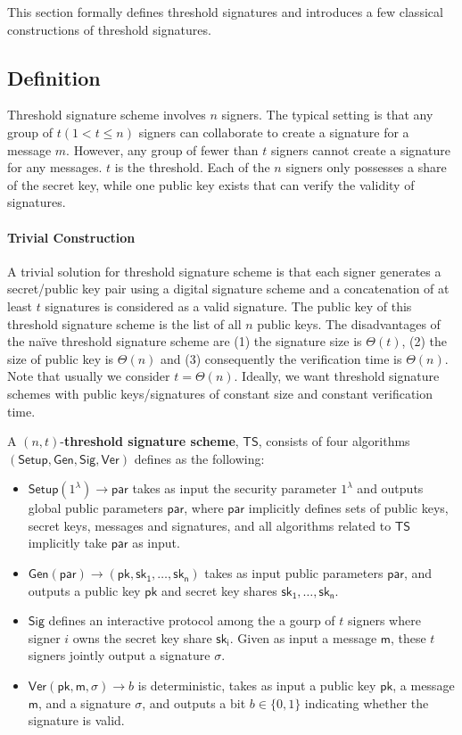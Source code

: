 This section formally defines threshold signatures and introduces a few classical constructions of threshold signatures. 
\subsection{Definition}
Threshold signature scheme involves $n$ signers. The typical setting is that any group of $t (1<t\le n)$ signers can collaborate to create a signature for a message $m$. However, any group of fewer than $t$ signers cannot create a signature for any messages. $t$ is the threshold. Each of the $n$ signers only possesses a share of the secret key, while one public key exists that can verify the validity of signatures. 

\paragraph{Trivial Construction} A trivial solution for threshold signature scheme is that each signer generates a secret/public key pair using a digital signature scheme and a concatenation of at least $t$ signatures is considered as a valid signature. The public key of this threshold signature scheme is the list of all $n$ public keys. The disadvantages of the na\"ive threshold signature scheme are (1) the signature size is $\Theta(t)$, (2) the size of public key is $\Theta(n)$ and (3) consequently the verification time is $\Theta(n)$. Note that usually we consider $t = \Theta(n)$. Ideally, we want threshold signature schemes with public keys/signatures of constant size and constant verification time. 

\begin{definition}
    A $(n, t)$-\textbf{threshold signature scheme}, $\mathsf{TS}$, consists of four algorithms $(\mathsf{Setup, Gen, Sig, Ver})$ defines as the following:
    \begin{itemize}
        \item $\mathsf{Setup}(1^\lambda)\to \mathsf{par}$ takes as input the security parameter $1^\lambda$ and outputs global public parameters $\mathsf{par}$, where $\mathsf{par}$ implicitly defines sets of public keys, secret keys, messages and signatures, and all algorithms related to $\mathsf{TS}$ implicitly take $\mathsf{par}$ as input. 
        \item $\mathsf{Gen(par)}\to (\mathsf{pk, sk_1,\dots, sk_n})$ takes as input public parameters $\mathsf{par}$, and outputs a public key $\mathsf{pk}$ and secret key shares $\mathsf{sk_1, \dots, sk_n}$. 
        \item $\mathsf{Sig}$ defines an interactive protocol among the a gourp of $t$ signers where signer $i$ owns the secret key share $\mathsf{sk_i}$. Given as input a message $\mathsf{m}$, these $t$ signers jointly output a signature $\sigma$. 
        \item $\mathsf{Ver}(\mathsf{pk}, \mathsf{m}, \sigma)\to b$ is deterministic, takes as input a public key $\mathsf{pk}$, a message $\mathsf{m}$, and a signature $\sigma$, and outputs a bit $b\in\{0,1\}$ indicating whether the signature is valid. 
    \end{itemize}
\end{definition}

